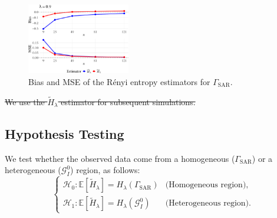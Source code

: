 \documentclass[
  lettersize  journal,
]{IEEEtran}%
\providecommand{\DIFaddtex}[1]{{\protect\color{blue}\uwave{#1}}} %
\providecommand{\DIFdeltex}[1]{{\protect\color{red}\sout{#1}}} %
\providecommand{\DIFdelbegin}{} %
\providecommand{\DIFdelend}{} %
\providecommand{\DIFaddFL}[1]{\DIFadd{#1}} %
\providecommand{\DIFdelFL}[1]{\DIFdel{#1}} %
\providecommand{\DIFaddbeginFL}{} %
\providecommand{\DIFaddendFL}{} %
\providecommand{\DIFdelbeginFL}{} %
\providecommand{\DIFdelendFL}{} %
\providecommand{\DIFadd}[1]{\texorpdfstring{\DIFaddtex{#1}}{#1}} %
\providecommand{\DIFdel}[1]{\texorpdfstring{\DIFdeltex{#1}}{}} %
\newcommand{\DIFscaledelfig}{0.5}
\newlength{\DIFdelgraphicswidth} %
\newlength{\DIFdelgraphicsheight} %
\newcommand{\DIFaddincludegraphics}[2][]{{\color{blue}\fbox{\DIFOincludegraphics[#1]{#2}}}} %
\newcommand{\DIFdelincludegraphics}[2][]{%
\sbox{\DIFdelgraphicsbox}{\DIFOincludegraphics[#1]{#2}}%
\settoboxwidth{\DIFdelgraphicswidth}{\DIFdelgraphicsbox} %
\settoboxtotalheight{\DIFdelgraphicsheight}{\DIFdelgraphicsbox} %
\scalebox{\DIFscaledelfig}{%
\parbox[b]{\DIFdelgraphicswidth}{\usebox{\DIFdelgraphicsbox}\\[-\baselineskip] \rule{\DIFdelgraphicswidth}{0em}}\llap{\resizebox{\DIFdelgraphicswidth}{\DIFdelgraphicsheight}{%
\setlength{\unitlength}{\DIFdelgraphicswidth}%
\begin{picture}(1,1)%
\thicklines\linethickness{2pt} %
{\color[rgb]{1,0,0}\put(0,0){\framebox(1,1){}}}%
{\color[rgb]{1,0,0}\put(0,0){\line( 1,1){1}}}%
{\color[rgb]{1,0,0}\put(0,1){\line(1,-1){1}}}%
\end{picture}%
}\hspace*{3pt}}} %
} %
\DeclareRobustCommand{\DIFdelbegin}{\DIFOdelbegin \let\includegraphics\DIFdelincludegraphics} %
\DeclareRobustCommand{\DIFdelend}{\DIFOaddend \let\includegraphics\DIFOincludegraphics} %
\DeclareRobustCommand{\DIFaddbeginFL}{\DIFOaddbeginFL \let\includegraphics\DIFaddincludegraphics} %
\DeclareRobustCommand{\DIFaddendFL}{\DIFOaddendFL \let\includegraphics\DIFOincludegraphics} %
\DeclareRobustCommand{\DIFdelbeginFL}{\DIFOdelbeginFL \let\includegraphics\DIFdelincludegraphics} %
\DeclareRobustCommand{\DIFdelendFL}{\DIFOaddendFL \let\includegraphics\DIFOincludegraphics} %
\begin{document}
\begin{figure}[hbt]
  \DIFdelbeginFL %




\DIFdelendFL \DIFaddbeginFL \centering
  \includegraphics[width=0.40\textwidth]{Figures-R1/fig-bias_mse-1.pdf}
  \vspace{0.1em}
  \DIFaddendFL \caption{\DIFdelbeginFL %
\DIFdelendFL Bias and MSE of the Rényi entropy estimators for \DIFdelbeginFL \DIFdelFL{\(\Gamma_{\text{SAR}}\)}\DIFdelendFL \DIFaddbeginFL \DIFaddFL{$\Gamma_{\text{SAR}}$}\DIFaddendFL .}
  \DIFdelbeginFL %

\DIFdelendFL \DIFaddbeginFL \label{fig-bias_mse}
\DIFaddendFL \end{figure}

\DIFdelbegin \DIFdel{We use the \(\widetilde{H}_{\lambda}\) estimator for subsequent
simulations.
}%

\DIFdelend \subsection{Hypothesis Testing}\label{hypothesis-testing}

We test whether the observed data come from a homogeneous
(\(\Gamma_{\text{SAR}}\)) or a heterogeneous (\(\mathcal{G}^0_I\))
region, as follows: \begin{equation}\label{eq:hypothesis_test}
\begin{cases}
\mathcal{H}_0: \mathbb{E}[\widetilde{H}_{\lambda}] = H_{\lambda}(\Gamma_{\text{SAR}}) & \text{(Homogeneous region)}, \\[6pt]
\mathcal{H}_1: \mathbb{E}[\widetilde{H}_{\lambda}] = H_{\lambda}(\mathcal{G}^0_I) & \text{(Heterogeneous region)}.
\end{cases}
\end{equation}
\end{document}
